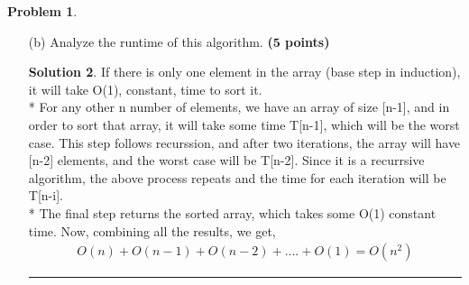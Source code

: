 \documentclass{article}
\theoremstyle{definition}
\newtheorem{problem}{Problem}
\def\fline{\rule{0.75\linewidth}{0.5pt}}
\newcommand{\finishline}{\begin{center}\fline\end{center}}
\newtheorem*{solution*}{Solution}
\newenvironment{solution}{\begin{solution*}}{{\finishline} \end{solution*}}
\newcommand{\grade}[1]{\hfill{\textbf{($\mathbf{#1}$ points)}}}
\begin{document}
\begin{problem}
\begin{enumerate}
	\begin{solution}
\begin{itemize}
		\item \textbf{Base Case:} when array is of size n = 1; it is already sorted, and the algorithm returns array, which is sorted
		\item \textbf{Inductive Step:}
			There are basically two things happening in insertion sort,
			\begin{enumerate}
				\item Sorting the A[1,\ldots,(n-1)] array
				\item Inserting $n^{th}$ element at the end of the sorted array \\*
			\end{enumerate}
		 By looking at the recurrsive algorithm, we notice that it goes by moving A[i-1], A[i-2], A[i-3] and so on by one position to the right until it finds the proper position for A[i]. Once it is done shifting, it inserts the value of A[i]. The subarray $A[1,\ldots,i]$ is in sorted order now. Hence, we proved for the case where there an array consist of n elements.\bigskip\\*
		Now for n+1 elements, \\*
		The condition causing the recurrsive algorithm to terminate is i $>$ n. Because after each loop iteration increases i by 1, we must have i = n+1 at that time. We have already shown that the subarray A[1,\ldots,n+1 -1] = A[1,\ldots,n] consists of the elements originally in A[1,\ldots,n], but in sorted order. \\*
		In other words, the algorithm works the same way, first sorts the aray of n elements and then inserts $n+1^{th}$ element in the sorted array. Which proves the algorithm for any n+1 elements.
	\end{itemize}
\end{solution}

	\item[(b)] Analyze the runtime of this algorithm. \grade{5} 
	
	\begin{solution}
If there is only one element in the array (base step in induction), it will take O(1), constant, time to sort it.\bigskip\\*
	For any other n number of elements, we have an array of size [n-1], and in order to sort that array, it will take some time T[n-1], which will be the worst case. This step follows recurssion, and  after two iterations, the array will have [n-2] elements, and the worst case will be T[n-2]. Since it is a recurrsive algorithm, the above process repeats and the time for each iteration will be T[n-i].\bigskip\\*
	The final step returns the sorted array, which takes some O(1) constant time.
	Now, combining all the results, we get,
	\begin{align*}
		O(n) + O(n-1) + O(n-2) +  .... + O(1) = O(n^{2})
	\end{align*}
\end{solution}


\end{enumerate}
\end{problem}
\end{document}
